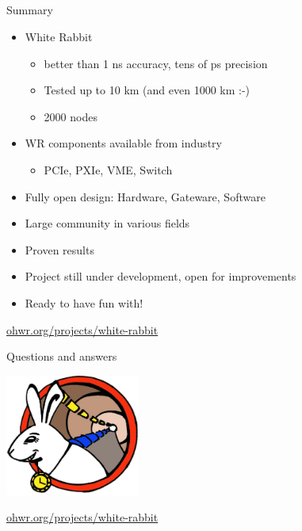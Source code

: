 \documentclass[compress,red]{beamer}
\begin{document}
\subsection{}
\begin{frame}{Summary}


    \begin{itemize}
      \item White Rabbit
      \begin{itemize}
	\item better than 1 ns accuracy, tens of ps precision
	\item Tested up to 10 km (and even 1000 km :-)
	\item 2000 nodes
      \end{itemize}
      \item WR components available from industry
      \begin{itemize}
	\item PCIe, PXIe, VME, Switch
      \end{itemize}
      \item Fully open design: Hardware, Gateware, Software
      \item Large community in various fields
      \item Proven results
      \item Project still under development, open for improvements
      \item Ready to have fun with!
    \end{itemize}    

\begin{center}
\href{http://ohwr.org/projects/white-rabbit}{ohwr.org/projects/white-rabbit}
\end{center}

 
\end{frame}
\begin{frame}{Questions and answers}

    \begin{center}
    \includegraphics[height=4.0cm]{logo/WRlogo.jpg}
    \end{center}

\begin{center}
\href{http://ohwr.org/projects/white-rabbit}{ohwr.org/projects/white-rabbit}
\end{center}
\end{frame}
\end{document}
